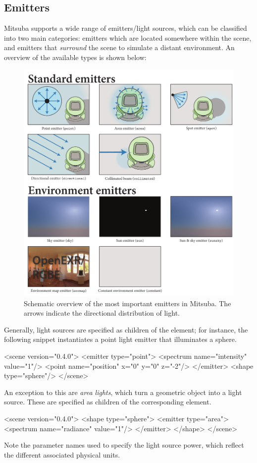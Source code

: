 \newpage
\subsection{Emitters}
\label{sec:emitters}
Mitsuba supports a wide range of emitters/light sources, which can be classified
into two main categories: emitters which are located somewhere within the scene, and emitters
that \emph{surround} the scene to simulate a distant environment. An overview of the available
types is shown below:
\begin{figure}[h!]
\centering
\includegraphics[width=15.5cm]{images/emitter_overview.pdf}
\caption{
    Schematic overview of the most important emitters in Mitsuba.
    The arrows indicate the directional distribution of light.
}
\end{figure}
\newpage
Generally, light sources are specified as children of the  element; for instance,
the following snippet instantiates a point light emitter that illuminates a sphere.
\begin{xml}
<scene version="0.4.0">
	<emitter type="point">
		<spectrum name="intensity" value="1"/>
		<point name="position" x="0" y="0" z="-2"/>
	</emitter>
	<shape type="sphere"/>
</scene>
\end{xml}
An exception to this are \emph{area lights}, which turn a geometric object into a light source.
These are specified as children of the corresponding  element.
\begin{xml}
<scene version="0.4.0">
	<shape type="sphere">
		<emitter type="area">
			<spectrum name="radiance" value="1"/>
		</emitter>
	</shape>
</scene>
\end{xml}
Note the parameter names used to specify the light source power, which reflect
the different associated physical units.
